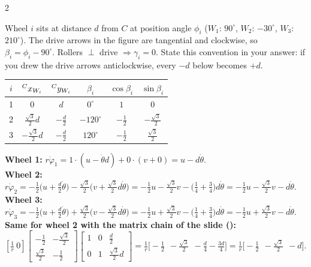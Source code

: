\begin{multicols}{2}
\begin{deriv}
Wheel $i$ sits at distance $d$ from $C$ at position angle $\phi_i$ ($W_1$: $90^\circ$, $W_2$: $-30^\circ$, $W_3$: $210^\circ$). The drive arrows in the figure are tangential and clockwise, so $\beta_i=\phi_i-90^\circ$. Rollers $\perp$ drive $\Rightarrow\gamma_i=0$. State this convention in your answer: if you drew the drive arrows anticlockwise, every $-d$ below becomes $+d$.
\begin{center}\small\begin{tabular}{@{}cccccc@{}}\toprule
$i$ & ${}^{C}x_{W_{i}}$ & ${}^{C}y_{W_{i}}$ & $\beta_i$ & $\cos\beta_i$ & $\sin\beta_i$\\\midrule
1 & $0$ & $d$ & $0^\circ$ & $1$ & $0$\\
2 & $\frac{\sqrt3}2d$ & $-\frac d2$ & $-120^\circ$ & $-\frac12$ & $-\frac{\sqrt3}2$\\
3 & $-\frac{\sqrt3}2d$ & $-\frac d2$ & $120^\circ$ & $-\frac12$ & $\frac{\sqrt3}2$\\\bottomrule\end{tabular}\end{center}
\end{deriv}
\begin{deriv}[Step 2: each wheel's row from $r\dot\varphi_i=\cos\beta_i(u-\dot\theta\wXy i)+\sin\beta_i(v+\dot\theta\wXx i)$ \added]
\textbf{Wheel 1:} $r\dot\varphi_1=1\cdot(u-\dot\theta d)+0\cdot(v+0)=u-d\dot\theta$.\\
\textbf{Wheel 2:} $r\dot\varphi_2=-\tfrac12\big(u+\tfrac d2\dot\theta\big)-\tfrac{\sqrt3}2\big(v+\tfrac{\sqrt3}2d\dot\theta\big)=-\tfrac12u-\tfrac{\sqrt3}2v-\big(\tfrac14+\tfrac34\big)d\dot\theta=-\tfrac12u-\tfrac{\sqrt3}2v-d\dot\theta$.\\
\textbf{Wheel 3:} $r\dot\varphi_3=-\tfrac12\big(u+\tfrac d2\dot\theta\big)+\tfrac{\sqrt3}2\big(v-\tfrac{\sqrt3}2d\dot\theta\big)=-\tfrac12u+\tfrac{\sqrt3}2v-\big(\tfrac14+\tfrac34\big)d\dot\theta=-\tfrac12u+\tfrac{\sqrt3}2v-d\dot\theta$.\\
\textbf{Same for wheel 2 with the matrix chain of the slide ():} $[\tfrac1r\ 0]\begin{bmatrix}-\frac12&-\frac{\sqrt3}2\\\frac{\sqrt3}2&-\frac12\end{bmatrix}\begin{bmatrix}1&0&\frac d2\\0&1&\frac{\sqrt3}2d\end{bmatrix}=\frac1r\big[-\tfrac12\ \ -\tfrac{\sqrt3}2\ \ -\tfrac d4-\tfrac{3d}4\big]=\frac1r\big[-\tfrac12\ \ -\tfrac{\sqrt3}2\ \ -d\big]$.

\end{deriv}
\end{multicols}
